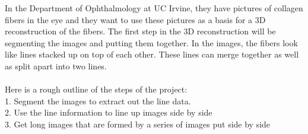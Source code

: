 \documentclass[11pt,psfig]{article}
\begin{document}
In the Department of Ophthalmology at UC Irvine, they have pictures of collagen fibers in the eye and they want to use these pictures as a basis for a 3D reconstruction of the fibers. The first step in the 3D reconstruction will be segmenting the images and putting them together. In the images, the fibers look like lines stacked up on top of each other. These lines can merge together as well as split apart into two lines. \\
\\
Here is a rough outline of the steps of the project: \\
1. Segment the images to extract out the line data. \\
2. Use the line information to line up images side by side \\
3. Get long images that are formed by a series of images put side by side \\
\end{document}
